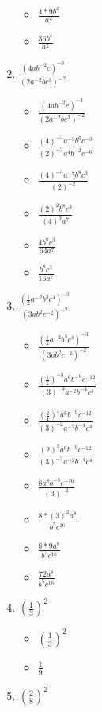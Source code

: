 \documentclass{article}
\begin{document}
\begin{enumerate}
\begin{itemize}
  \item {\Large $\frac{4*9b^{4}}{a^{2}}$}
  \item {\Large $\frac{36b^{4}}{a^{2}}$}
  \end{itemize}
\item {\Large $\frac{(4ab^{-2}c)^{-3}}{(2a^{-2}bc^{3})^{-2}}$}
  \begin{itemize}
  \item {\Large $\frac{(4ab^{-2}c)^{-3}}{(2a^{-2}bc^{3})^{-2}}$}
  \item {\Large $\frac{(4)^{-3}a^{-3}b^{6}c^{-3}}{(2)^{-2}a^{4}b^{-2}c^{-6}}$}
  \item {\Large $\frac{(4)^{-3}a^{-7}b^{8}c^{3}}{(2)^{-2}}$}
  \item {\Large $\frac{(2)^{2}b^{8}c^{3}}{(4)^{3}a^{7}}$}
  \item {\Large $\frac{4b^{8}c^{3}}{64a^{7}}$}
  \item {\Large $\frac{b^{8}c^{3}}{16a^{7}}$}
  \end{itemize}
\item {\Large $\frac{(\frac{1}{2}a^{-2}b^{3}c^{4})^{-3}}{(3ab^{2}c^{-2})^{-2}}$}
  \begin{itemize}
  \item {\Large $\frac{(\frac{1}{2}a^{-2}b^{3}c^{4})^{-3}}{(3ab^{2}c^{-2})^{-2}}$}
  \item {\Large $\frac{(\frac{1}{2})^{-3}a^{6}b^{-9}c^{-12}}{(3)^{-2}a^{-2}b^{-4}c^{4}}$}
  \item {\Large $\frac{(\frac{2}{1})^{3}a^{6}b^{-9}c^{-12}}{(3)^{-2}a^{-2}b^{-4}c^{4}}$}
  \item {\Large $\frac{(2)^{3}a^{6}b^{-9}c^{-12}}{(3)^{-2}a^{-2}b^{-4}c^{4}}$}
  \item {\Large $\frac{8a^{8}b^{-5}c^{-16}}{(3)^{-2}}$}
  \item {\Large $\frac{8*(3)^{2}a^{8}}{b^{5}c^{16}}$}
  \item {\Large $\frac{8*9a^{8}}{b^{5}c^{16}}$}
  \item {\Large $\frac{72a^{8}}{b^{5}c^{16}}$}
  \end{itemize}
\item {\Large $(\frac{1}{3})^{2}$}
  \begin{itemize}
  \item {\Large $(\frac{1}{3})^{2}$}
  \item {\Large $\frac{1}{9}$}
  \end{itemize}
\item {\Large $(\frac{2}{8})^{2}$}
  \begin{itemize}

\end{itemize}
\end{enumerate}
\end{document}
